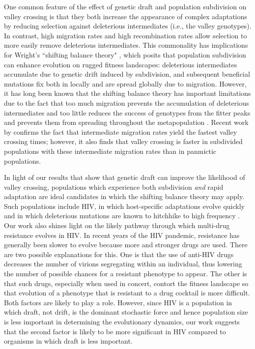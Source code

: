 \documentclass[rmp]{revtex4}
\begin{document}
\begin{spacing}{1.5}
One common feature of the effect of genetic draft and population subdivision on valley crossing is that they both increase the appearance of complex adaptations by reducing selection against deleterious intermediates (i.e., the valley genotypes).
In contrast, high migration rates and high recombination rates \citep{neher_shraiman_2009} allow selection to more easily remove deleterious intermediates.
This commonality has implications for Wright's ``shifting balance theory" \citep{Wright:1932}, which posits that population subdivision can enhance evolution on rugged fitness landscapes: deleterious intermediates accumulate due to genetic drift induced by subdivision, and subsequent beneficial mutations fix both in locally and are spread globally due to migration.
However, it has long been known that the shifting balance theory has important limitations due to the fact that too much migration prevents the accumulation of deleterious intermediates and too little reduces the success of genotypes from the fitter peaks and prevents them from spreading throughout the metapopulation \citep{coyne_barton_turelli_2000,Van-Cleve:Weissman:2015}.
Recent work by \citet{Bitbol:Schwab:2014} confirms the fact that intermediate migration rates yield the fastest valley crossing times; however, it also finds that valley crossing is faster in subdivided populations with these intermediate migration rates than in panmictic populations.

In light of our results that show that genetic draft can improve the likelihood of valley crossing, populations which experience both subdivision \emph{and} rapid adaptation are ideal candidates in which the shifting balance theory may apply.
Such populations include HIV, in which host-specific adaptations evolve quickly \citep{zhang_1997, wain_2007, dapp_2017, theys_2018} and in which deleterious mutations are known to hitchhike to high frequency \citep{zanini_2013, zanini_2015}.
Our work also shines light on the likely pathway through which multi-drug resistance evolves in HIV.
In recent years of the HIV pandemic, resistance has generally been slower to evolve \citep{feder_2015} because more and stronger drugs are used.
There are two possible explanations for this.
One is that the use of anti-HIV drugs decreases the number of virions segregating within an individual, thus lowering the number of possible chances for a resistant phenotype to appear.
The other is that such drugs, especially when used in concert, contort the fitness landscape so that evolution of a phenotype that is resistant to a drug cocktail is more difficult.
Both factors are likely to play a role.
However, since HIV is a population in which draft, not drift, is the dominant stochastic force and hence population size is less important in determining the evolutionary dynamics, our work suggests that the second factor is likely to be more significant in HIV compared to organisms in which draft is less important.


\end{spacing}
\end{document}

